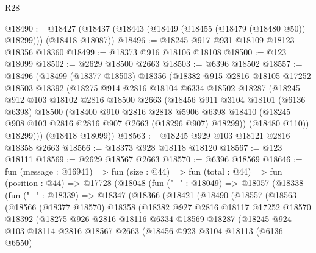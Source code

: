 \begin{lexlean}{R28}
\begin{coremodule}
@18490 := @18427 (@18437 (@18443 (@18449 (@18455 (@18479 (@18480 @50)) @18299))) (@18418 @18087))
@18496 := @18245 @917 @931 @18109 @18123 @18356 @18360
@18499 := @18373 @916 @18106 @18108
@18500 := @123 @18099
@18502 := @2629 @18500 @2663
@18503 := @6396 @18502
@18557 := @18496
    (@18499
      (@18377 @18503)
      @18356
      (@18382
        @915
        @2816
        @18105
        @17252
        @18503
        @18392
        (@18275
          @914
          @2816
          @18104
          @6334
          @18502
          @18287
          (@18245
            @912
            @103
            @18102
            @2816
            @18500
            @2663
            (@18456
              @911
              @3104
              @18101
              (@6136 @6398)
              @18500
              (@18400
                @910
                @2816
                @2818
                @5906
                @6398
                @18410
                (@18245 @908 @103 @2816 @2816 @907 @2663 (@18296 @907) @18299))
              (@18480 @110))
            @18299)))
      (@18418 @18099))
@18563 := @18245 @929 @103 @18121 @2816 @18358 @2663
@18566 := @18373 @928 @18118 @18120
@18567 := @123 @18111
@18569 := @2629 @18567 @2663
@18570 := @6396 @18569
@18646 := fun (message : @16941) =>
  fun (size : @44) =>
  fun (total : @44) =>
  fun (position : @44) =>
  @17728
    (@18048
      (fun ("_" : @18049) =>
      @18057
        (@18338
          (fun ("_" : @18339) =>
          @18347
            (@18366
              (@18421
                (@18490
                  (@18557
                    (@18563
                      (@18566
                        (@18377 @18570)
                        @18358
                        (@18382
                          @927
                          @2816
                          @18117
                          @17252
                          @18570
                          @18392
                          (@18275
                            @926
                            @2816
                            @18116
                            @6334
                            @18569
                            @18287
                            (@18245
                              @924
                              @103
                              @18114
                              @2816
                              @18567
                              @2663
                              (@18456
                                @923
                                @3104
                                @18113
                                (@6136 @6550)

\end{coremodule}
\end{lexlean}
